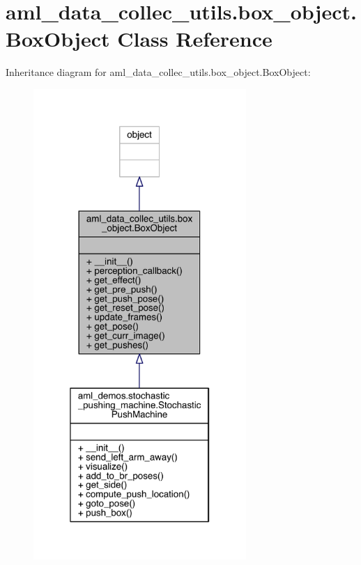 \hypertarget{classaml__data__collec__utils_1_1box__object_1_1_box_object}{}\section{aml\+\_\+data\+\_\+collec\+\_\+utils.\+box\+\_\+object.\+Box\+Object Class Reference}
\label{classaml__data__collec__utils_1_1box__object_1_1_box_object}


Inheritance diagram for aml\+\_\+data\+\_\+collec\+\_\+utils.\+box\+\_\+object.\+Box\+Object\+:
\nopagebreak
\begin{figure}[H]
\begin{center}
\leavevmode
\includegraphics[width=229pt]{classaml__data__collec__utils_1_1box__object_1_1_box_object__inherit__graph}
\end{center}
\end{figure}


